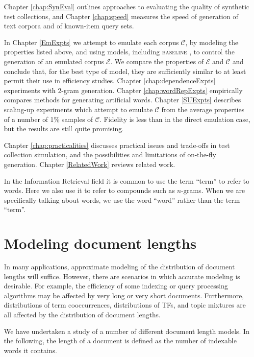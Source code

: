 \documentclass[11pt]{report}
\newcommand{\script}[1]{$\mathcal{#1}$}
\begin{document}
Chapter \ref{chap:SynEval} outlines approaches to evaluating the quality of
synthetic test collections, and Chapter \ref{chap:speed} measures the speed
of generation of text corpora and of known-item query sets.

In Chapter \ref{EmExpts} we attempt to emulate each corpus \script{C},
by modeling the properties listed above, and using models, including
\textsc{baseline} , to control the generation of an emulated corpus
\script{E}.  We compare the properties of \script{E} and \script{C}
and conclude that, for the best type of model, they are sufficiently
similar to at least permit their use in efficiency studies.  Chapter
\ref{chap:dependenceExpts} experiments with 2-gram generation. Chapter
\ref{chap:wordRepExpts} empirically compares methods for generating
artificial words.
Chapter \ref{SUExpts} describes scaling-up experiments which attempt
to emulate \script{C} from the average properties of a number of 1\%
samples of \script{C}.  Fidelity is less than in the direct emulation
case, but the results are still quite promising.

Chapter \ref{chap:practicalities} discusses practical issues and trade-offs in
test collection simulation, and the possibilities and limitations of
on-the-fly generation.   Chapter \ref{RelatedWork} reviews related
work.

In the Information Retrieval field it is common to use the term
``term'' to refer to words.  Here we also use it to refer to compounds
such as $n$-grams.  When we are specifically talking about words, we
use the word ``word'' rather than the term ``term''.


\chapter{Modeling document lengths}   %
\label{LenMod}
In many applications, approximate modeling of the distribution of
document lengths will suffice.  However, there are scenarios in which 
accurate modeling is desirable.  For example, the efficiency of some indexing or query 
processing algorithms may be affected by very long or very short
documents.  Furthermore, distributions of term cooccurrences,
distributions of TFs, and topic mixtures are all affected by the
distribution of document lengths.

We have undertaken a study of a number of different document length models.  In the
following, the length of a document is defined as the number of
indexable words it contains.
\end{document}
